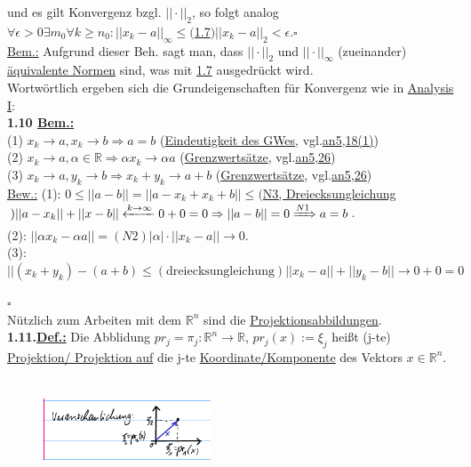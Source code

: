 \documentclass[11pt]{article}
\begin{document}
	und es gilt Konvergenz bzgl. $||\cdot||_2$, so folgt analog\\
	$\forall \epsilon > 0 \exists m_0 \forall k\geq n_0: ||x_k-a||_\infty \leq 
	($\ul{1.7}$) ||x_k-a||_2<\epsilon.\square$\\
	\underline{Bem.:} Aufgrund dieser Beh. sagt man, dass $||\cdot||_2$ und 
	$||\cdot||_\infty$ (zueinander)  \ul{äquivalente Normen} 
	sind, was mit  \ul{1.7} ausgedrückt wird.\\
	Wortwörtlich ergeben sich die Grundeigenschaften für Konvergenz wie in 
	\ul{Analysis I}:\\
	\textbf{1.10 \underline{Bem.:}}\\
	(1)  \ul{$x_k \rightarrow a, x_k \rightarrow b 
	\Rightarrow a = b$}  (\ul{Eindeutigkeit des GWes}, 
	vgl.\ul{an5,18(1)})\\
	(2) \ul{$x_k \rightarrow a, \alpha \in \mathbb{R}
	\Rightarrow \alpha x_k\rightarrow \alpha a$}  
	(\ul{Grenzwertsätze}, vgl.\ul{an5,26})\\
	(3) \ul{$x_k \rightarrow a, y_k \rightarrow b 
	\Rightarrow x_k + y_k \rightarrow a + b$}  
	(\ul{Grenzwertsätze}, vgl.\ul{an5,26})\\
	\underline{Bew.:} (1): $0\leq||a-b||=||a-x_k+x_k+b|| \leq ($\ul{N3, 
	Dreiecksungleichung}$) ||a-x_k||+||x-b|| 
	\xleftarrow{k\rightarrow\infty}0+0=0\\
	\Rightarrow||a-b||=0 \xRightarrow[]{N1} a = b$.\\
	(2): $||\alpha x_k-\alpha a|| = (N2) |\alpha|\cdot||x_k-a||\rightarrow0.$\\
	(3): $||(x_k+y_k)-(a+b)\leq (\text{dreiecksungleichung}) 
	||x_k-a||+||y_k-b||\rightarrow0+0=0$\\
	\strut\hfill$\square$\\
	Nützlich zum Arbeiten mit dem $\mathbb{R}^n$ sind die 
	\ul{Projektionsabbildungen}.\\
	\textbf{1.11.\underline{Def.:}} Die Abblidung $pr_j=\pi_j : 
	\mathbb{R}^n\rightarrow\mathbb{R}$, 
	\ul{$pr_j(x):=\xi_j$} heißt (j-te) \ul{Projektion/ 
	Projektion auf} die j-te \ul{Koordinate/Komponente} des Vektors 
	$x\in\mathbb{R}^n$.\\
	\begin{figure}[h]
		\includegraphics[width=5cm,height=3cm]{Veranschaulichung}
	\end{figure}\\
\end{document}
